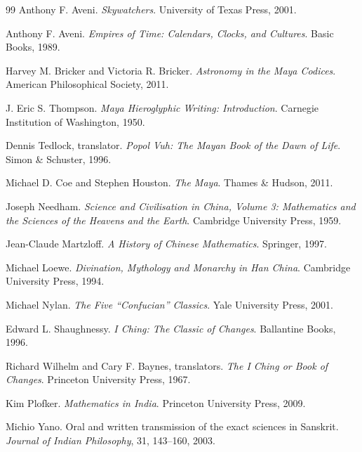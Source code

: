 \documentclass[11pt]{book}
\begin{document}
\begin{thebibliography}{99}
Anthony F. Aveni.
\newblock \emph{Skywatchers}.
\newblock University of Texas Press, 2001.

Anthony F. Aveni.
\newblock \emph{Empires of Time: Calendars, Clocks, and Cultures}.
\newblock Basic Books, 1989.

Harvey M. Bricker and Victoria R. Bricker.
\newblock \emph{Astronomy in the Maya Codices}.
\newblock American Philosophical Society, 2011.

J. Eric S. Thompson.
\newblock \emph{Maya Hieroglyphic Writing: Introduction}.
\newblock Carnegie Institution of Washington, 1950.

Dennis Tedlock, translator.
\newblock \emph{Popol Vuh: The Mayan Book of the Dawn of Life}.
\newblock Simon \& Schuster, 1996.

Michael D. Coe and Stephen Houston.
\newblock \emph{The Maya}.
\newblock Thames \& Hudson, 2011.

Joseph Needham.
\newblock \emph{Science and Civilisation in China, Volume 3: Mathematics and the Sciences of the Heavens and the Earth}.
\newblock Cambridge University Press, 1959.

Jean-Claude Martzloff.
\newblock \emph{A History of Chinese Mathematics}.
\newblock Springer, 1997.

Michael Loewe.
\newblock \emph{Divination, Mythology and Monarchy in Han China}.
\newblock Cambridge University Press, 1994.

Michael Nylan.
\newblock \emph{The Five ``Confucian'' Classics}.
\newblock Yale University Press, 2001.

Edward L. Shaughnessy.
\newblock \emph{I Ching: The Classic of Changes}.
\newblock Ballantine Books, 1996.

Richard Wilhelm and Cary F. Baynes, translators.
\newblock \emph{The I Ching or Book of Changes}.
\newblock Princeton University Press, 1967.

Kim Plofker.
\newblock \emph{Mathematics in India}.
\newblock Princeton University Press, 2009.

Michio Yano.
\newblock Oral and written transmission of the exact sciences in Sanskrit.
\newblock \emph{Journal of Indian Philosophy}, 31, 143--160, 2003.


\end{thebibliography}
\end{document}
